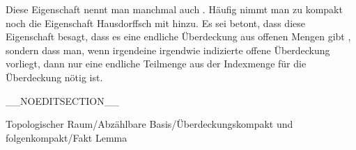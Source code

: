 Diese Eigenschaft nennt man manchmal auch  {.} Häufig nimmt man zu kompakt noch die Eigenschaft Hausdorffsch mit hinzu. Es sei betont, dass diese Eigenschaft
 besagt, dass es eine endliche Überdeckung aus offenen Mengen gibt
 {} {,}
sondern dass man, wenn irgendeine irgendwie indizierte offene Überdeckung vorliegt, dann nur eine endliche Teilmenge aus der Indexmenge für die Überdeckung nötig ist.

__NOEDITSECTION__

{Topologischer Raum/Abzählbare Basis/Überdeckungskompakt und folgenkompakt/Fakt}
{Lemma}
{}
{

\faktzusatz {}
\faktzusatz {}

}
